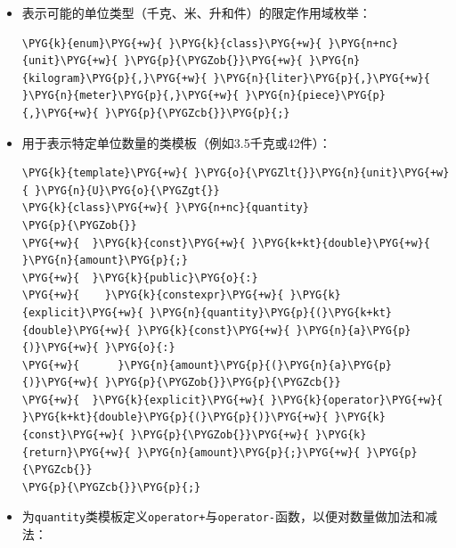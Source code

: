 \begin{itemize}
\item 表示可能的单位类型（千克、米、升和件）的限定作用域枚举：



\begin{codeblockbg}
\begin{Verbatim}[commandchars=\\\{\},breaklines=true,breakanywhere=true,fontsize=\codefont,xleftmargin=17bp]
\PYG{k}{enum}\PYG{+w}{ }\PYG{k}{class}\PYG{+w}{ }\PYG{n+nc}{unit}\PYG{+w}{ }\PYG{p}{\PYGZob{}}\PYG{+w}{ }\PYG{n}{kilogram}\PYG{p}{,}\PYG{+w}{ }\PYG{n}{liter}\PYG{p}{,}\PYG{+w}{ }\PYG{n}{meter}\PYG{p}{,}\PYG{+w}{ }\PYG{n}{piece}\PYG{p}{,}\PYG{+w}{ }\PYG{p}{\PYGZcb{}}\PYG{p}{;}
\end{Verbatim}
\end{codeblockbg}



\item 用于表示特定单位数量的类模板（例如3.5千克或42件）：



\begin{codeblockbg}
\begin{Verbatim}[commandchars=\\\{\},breaklines=true,breakanywhere=true,fontsize=\codefont,xleftmargin=17bp]
\PYG{k}{template}\PYG{+w}{ }\PYG{o}{\PYGZlt{}}\PYG{n}{unit}\PYG{+w}{ }\PYG{n}{U}\PYG{o}{\PYGZgt{}}
\PYG{k}{class}\PYG{+w}{ }\PYG{n+nc}{quantity}
\PYG{p}{\PYGZob{}}
\PYG{+w}{  }\PYG{k}{const}\PYG{+w}{ }\PYG{k+kt}{double}\PYG{+w}{ }\PYG{n}{amount}\PYG{p}{;}
\PYG{+w}{  }\PYG{k}{public}\PYG{o}{:}
\PYG{+w}{    }\PYG{k}{constexpr}\PYG{+w}{ }\PYG{k}{explicit}\PYG{+w}{ }\PYG{n}{quantity}\PYG{p}{(}\PYG{k+kt}{double}\PYG{+w}{ }\PYG{k}{const}\PYG{+w}{ }\PYG{n}{a}\PYG{p}{)}\PYG{+w}{ }\PYG{o}{:}
\PYG{+w}{      }\PYG{n}{amount}\PYG{p}{(}\PYG{n}{a}\PYG{p}{)}\PYG{+w}{ }\PYG{p}{\PYGZob{}}\PYG{p}{\PYGZcb{}}
\PYG{+w}{  }\PYG{k}{explicit}\PYG{+w}{ }\PYG{k}{operator}\PYG{+w}{ }\PYG{k+kt}{double}\PYG{p}{(}\PYG{p}{)}\PYG{+w}{ }\PYG{k}{const}\PYG{+w}{ }\PYG{p}{\PYGZob{}}\PYG{+w}{ }\PYG{k}{return}\PYG{+w}{ }\PYG{n}{amount}\PYG{p}{;}\PYG{+w}{ }\PYG{p}{\PYGZcb{}}
\PYG{p}{\PYGZcb{}}\PYG{p}{;}
\end{Verbatim}
\end{codeblockbg}



\item 为\texttt{quantity}类模板定义\texttt{operator+}与\texttt{operator-}函数，以便对数量做加法和减法：



\end{itemize}
